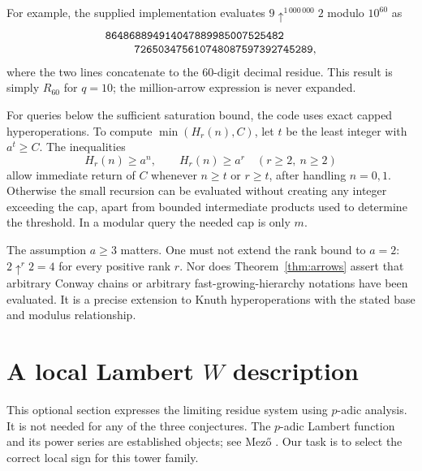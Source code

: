 \documentclass[11pt,a4paper]{article}
\numberwithin{equation}{section}
\theoremstyle{plain}
\theoremstyle{definition}
\begin{document}
For example, the supplied implementation evaluates
$9\uparrow^{1\,000\,000}2$ modulo $10^{60}$ as
\begin{equation*}
 \begin{split}
 &\texttt{864868894914047889985007525482}\\[-1mm]
 &\hspace{9mm}\texttt{726503475610748087597392745289},
 \end{split}
\end{equation*}
where the two lines concatenate to the $60$-digit decimal
residue.  This result is simply
$R_{60}$ for $q=10$; the million-arrow expression is never expanded.

For queries below the sufficient saturation bound, the code uses exact
capped hyperoperations.  To compute $\min(H_r(n),C)$, let $t$ be the
least integer with $a^t\ge C$.  The inequalities
\[
 H_r(n)\ge a^n,\qquad H_r(n)\ge a^r\quad(r\ge2,\ n\ge2)
\]
allow immediate return of $C$ whenever $n\ge t$ or $r\ge t$,
after handling $n=0,1$.  Otherwise the small recursion can be evaluated
without creating any integer exceeding the cap, apart from bounded
intermediate products used to determine the threshold.
In a modular query the needed cap is only $m$.

The assumption $a\ge3$ matters.  One must not extend the rank bound to
$a=2$: $2\uparrow^r2=4$ for every positive rank $r$.
Nor does Theorem~\ref{thm:arrows} assert that arbitrary Conway chains or
arbitrary fast-growing-hierarchy notations have been evaluated.  It is
a precise extension to Knuth hyperoperations with the stated base and
modulus relationship.

\section{A local Lambert \texorpdfstring{$W$}{W} description}\label{sec:lambert}

This optional section expresses the limiting residue system using
$p$-adic analysis.  It is not needed for any of the three conjectures.
The $p$-adic Lambert function and its power series are established
objects; see Mez\H{o} \cite{mezo}.  Our task is to select the correct
local sign for this tower family.
\end{document}
